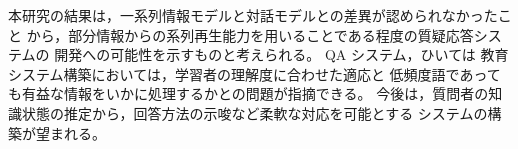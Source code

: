 \documentclass[twocolumn]{jarticle}
\begin{document}
本研究の結果は，一系列情報モデルと対話モデルとの差異が認められなかったこと
から，部分情報からの系列再生能力を用いることである程度の質疑応答システムの
開発への可能性を示すものと考えられる。
{QA} システム，ひいては
教育システム構築においては，学習者の理解度に合わせた適応と
低頻度語であっても有益な情報をいかに処理するかとの問題が指摘できる。
今後は，質問者の知識状態の推定から，回答方法の示唆など柔軟な対応を可能とする
システムの構築が望まれる。

\end{document}
